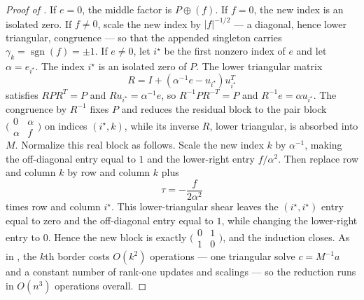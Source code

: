 \documentclass[preprint,12pt]{elsarticle}
\theoremstyle{plain}
\theoremstyle{nonumberplain}
\newtheorem{proof}{Proof}
\numberwithin{equation}{section}
\DeclareMathOperator{\sgn}{sgn}
\numberwithin{theorem}{section}
\begin{document}
\begin{proof}[Proof of ]
  If $e=0$, the middle factor is $P\oplus(f)$.  If $f=0$, the new index is an
  isolated zero.  If $f\ne0$, scale the new index by $|f|^{-1/2}$ --- a
  diagonal, hence lower triangular, congruence --- so that the appended
  singleton carries $\gamma_k=\sgn(f)=\pm1$.  If $e\ne0$, let $i^\star$ be the first
  nonzero index of $e$ and let $\alpha=e_{i^\star}$.  The index $i^\star$ is an
  isolated zero of $P$.  The lower triangular matrix
  \[
    R=I+(\alpha^{-1}e-u_{i^\star})u_{i^\star}^T
  \]
  satisfies $RPR^T=P$ and $Ru_{i^\star}=\alpha^{-1}e$, so
  $R^{-1}PR^{-T}=P$ and $R^{-1}e=\alpha u_{i^\star}$.  The congruence by $R^{-1}$ fixes $P$ and reduces the
  residual block to the pair block
  $\bigl(
    \begin{smallmatrix}0&\alpha\\\alpha&f
  \end{smallmatrix}\bigr)$ on
  indices $(i^\star,k)$, while its inverse $R$, lower triangular, is absorbed
  into $M$.  Normalize this real block as follows.  Scale the new
  index $k$ by $\alpha^{-1}$, making the off-diagonal entry equal to $1$ and
  the lower-right entry $f/\alpha^2$.  Then replace row and column $k$ by row
  and column $k$ plus
  \[
    \tau = - \frac{f}{2\alpha^2}
  \]
  times row and column $i^\star$.  This lower-triangular shear leaves the
  $(i^\star,i^\star)$ entry equal to zero and the off-diagonal entry equal to
  $1$, while changing the lower-right entry to $0$.  Hence the new block is
  exactly $\bigl(
    \begin{smallmatrix}0&1\\1&0
  \end{smallmatrix}\bigr)$, and the
  induction closes.  As in , the $k$th border costs
  $O(k^2)$ operations --- one triangular solve $c = M^{-1}a$ and a constant
  number of rank-one updates and scalings --- so the reduction runs in
  $O(n^3)$ operations overall.
\end{proof}
\end{document}
